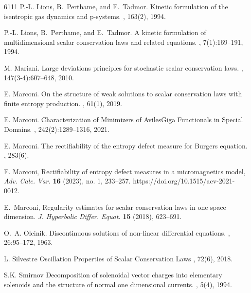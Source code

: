 \documentclass[11pt, twoside, reqno]{amsart}
\theoremstyle{definition}
\theoremstyle{remark}
\numberwithin{equation}{section}
\begin{document}
\begin{thebibliography}{6111}
P.-L. Lions, B.~Perthame, and E.~Tadmor.
\newblock Kinetic formulation of the isentropic gas dynamics and p-systems.
, 163(2), 1994.

P.-L. Lions, B.~Perthame, and E.~Tadmor.
\newblock A kinetic formulation of multidimensional scalar conservation laws
  and related equations.
, 7(1):169--191, 1994.



M. Mariani.
\newblock Large deviations principles for stochastic scalar conservation laws.
, 147(3-4):607--648, 2010.



E. Marconi.
\newblock On the structure of weak solutions to scalar conservation laws with finite entropy production.
, 61(1), 2019.


E. Marconi.
\newblock Characterization of Minimizers of Aviles{\textendash}Giga Functionals in Special Domains.
, 242(2):1289--1316, 2021.

E. Marconi.
\newblock The rectifiability of the entropy defect measure for Burgers equation.
, 283(6).


E. Marconi,
Rectifiability of entropy defect measures in a micromagnetics model,
\textit{Adv. Calc. Var.} \textbf{16} (2023), no. 1, 233–257.
https://doi.org/10.1515/acv-2021-0012.

 E.~Marconi, 
Regularity estimates for scalar conservation laws in one space dimension.
{\it J. Hyperbolic Differ. Equat.} {\bf 15} (2018), 623--691.


O.~A. Oleinik.
\newblock Discontinuous solutions of non-linear differential equations.
, 26:95--172, 1963.





L. Silvestre
\newblock Oscillation Properties of Scalar Conservation Laws
, 72(6), 2018.


S.K. Smirnov
\newblock Decomposition of solenoidal vector charges into elementary solenoids and the structure of normal one dimensional currents.
, 5(4), 1994.




\end{thebibliography}
\end{document}
